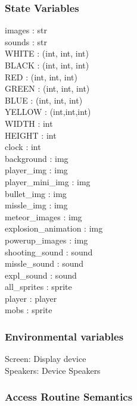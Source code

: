 \documentclass[12pt, titlepage]{article}
\begin{document}
\subsubsection {State Variables}
images : str\\
sounds : str\\
WHITE : (int, int, int)\\
BLACK : (int, int, int)\\
RED : (int, int, int)\\
GREEN : (int, int, int)\\
BLUE : (int, int, int)\\
YELLOW : (int,int,int)\\
WIDTH : int\\
HEIGHT : int\\
clock : int\\
background : img \\
player\_img : img \\
player\_mini\_img : img \\
bullet\_img : img \\
missle\_img : img \\
meteor\_images : img \\
explosion\_animation : img \\
powerup\_images : img \\
shooting\_sound : sound \\
missle\_sound : sound \\
expl\_sound : sound \\
all\_sprites : sprite \\
player : player \\
mobs : sprite \\

\subsubsection {Environmental variables}
Screen: Display device\\
Speakers: Device Speakers

\subsubsection {Access Routine Semantics}
 
\end{document}
